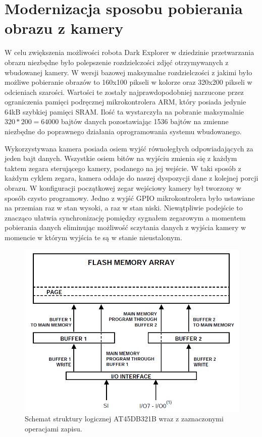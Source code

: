 \section{Modernizacja sposobu pobierania obrazu z kamery} 
\label{sec:img-acq}
W celu zwiększenia możliwości robota Dark Explorer w dziedzinie przetwarzania
obrazu niezbędne było polepszenie rozdzielczości zdjęć otrzymywanych z wbudowanej
kamery. W wersji bazowej maksymalne rozdzielczości z jakimi było możliwe
pobieranie obrazów to 160x100 pikseli w kolorze oraz 320x200 pikseli w odcieniach
szarości. Wartości te zostały najprawdopodobniej narzucone przez ograniczenia
pamięci podręcznej mikrokontrolera ARM, który posiada jedynie 64kB szybkiej
pamięci SRAM. Ilość ta wystarczyła na pobranie maksymalnie $320*200=64000$ bajtów
danych pozostawiając 1536 bajtów na zmienne niezbędne do poprawnego działania
oprogramowania systemu wbudowanego.

Wykorzystywana kamera posiada osiem wyjść równoległych odpowiadających za jeden
bajt danych. Wszystkie osiem bitów na wyjściu zmienia się z każdym taktem zegara
sterującego kamery, podanego na jej wejście. W taki sposób z każdym cyklem 
zegara, kamera oddaje do naszej dyspozycji dane z kolejnej porcji obrazu. W
konfiguracji początkowej zegar wejściowy kamery był tworzony w sposób czysto
programowy. Jedno z wyjść GPIO mikrokontrolera było ustawiane na przemian raz w
stan wysoki, a raz w stan niski. Niewątpliwie podejście to znacząco ułatwia
synchronizację pomiędzy sygnałem zegarowym a momentem pobierania danych
eliminując możliwość sczytania danych z wyjścia kamery w momencie w którym
wyjścia te są w stanie nieustalonym.

\begin{figure}[ht!]
 \centering \includegraphics[height=85mm]{../images/ch04/dataflash_structure.png}
 \caption{Schemat struktury logicznej AT45DB321B wraz z zaznaczonymi operacjami zapisu\cite{AT45DB321BApplicationNote}.}
 \label{fig:DataFlashStruct}
\end{figure}

